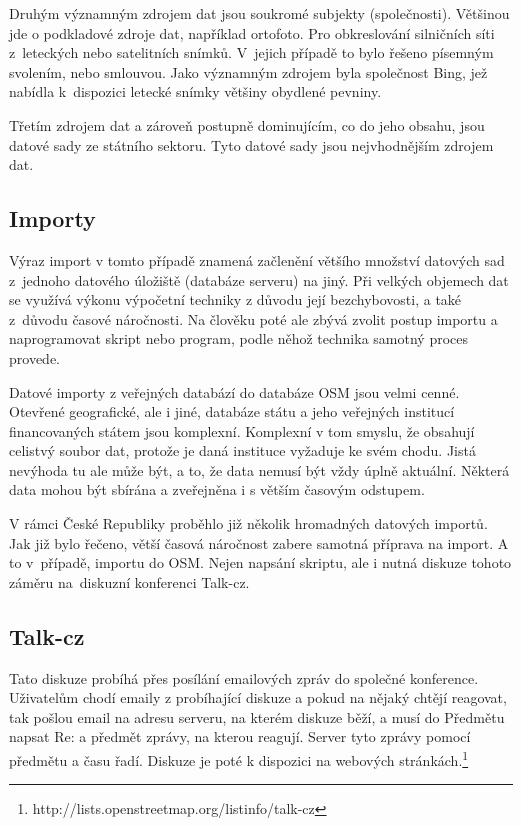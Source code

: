 Druhým významným zdrojem dat jsou soukromé subjekty (společnosti).
Většinou jde o podkladové zdroje dat, například ortofoto. Pro obkreslování
silničních síti z~leteckých nebo satelitních snímků. V~jejich případě to
bylo řešeno písemným svolením, nebo smlouvou. Jako významným zdrojem byla
společnost Bing, jež nabídla k~dispozici letecké snímky většiny
obydlené pevniny. 

Třetím zdrojem dat a zároveň postupně dominujícím, co do jeho obsahu, jsou
datové sady ze státního sektoru. Tyto datové sady jsou nejvhodnějším zdrojem
dat.

\subsection{Importy}
\label{Importy}
Výraz import v tomto případě znamená začlenění většího množství datových sad
z~jednoho datového úložiště (databáze serveru) na jiný. Při velkých objemech dat
se využívá výkonu výpočetní techniky z důvodu její bezchybovosti, a také
z~důvodu časové náročnosti. Na člověku poté ale zbývá zvolit postup importu
a naprogramovat skript nebo program, podle něhož technika samotný proces
provede. 

Datové importy z veřejných databází do databáze OSM jsou velmi cenné. 
Otevřené geografické, ale i jiné, databáze státu a jeho veřejných institucí 
financovaných státem jsou komplexní. Komplexní v tom smyslu, že obsahují celistvý
soubor dat, protože je daná instituce vyžaduje ke svém chodu. Jistá nevýhoda tu 
ale může být, a to, že data nemusí být vždy úplně aktuální. Některá data mohou 
být sbírána a zveřejněna i s větším časovým odstupem.

V rámci České Republiky proběhlo již několik hromadných datových importů. Jak 
již bylo řečeno, větší časová náročnost zabere samotná příprava na import. A to
v~případě, importu do OSM. Nejen napsání skriptu, ale i nutná diskuze tohoto záměru
na~diskuzní konferenci Talk-cz. 

\subsection{Talk-cz}
\label{Talk-cz}
Tato diskuze probíhá přes posílání emailových zpráv do společné konference. 
Uživatelům chodí emaily z probíhající diskuze a pokud na nějaký chtějí reagovat,
tak pošlou email na adresu serveru, na kterém diskuze běží, a musí do Předmětu 
napsat Re: a předmět zprávy, na kterou reagují. Server tyto zprávy pomocí 
předmětu a času řadí. Diskuze je poté k dispozici na webových stránkách.\footnote{http://lists.openstreetmap.org/listinfo/talk-cz}

